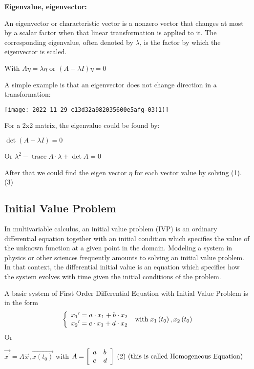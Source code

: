 \documentclass[a4paper]{article}
\begin{document}
\textbf{Eigenvalue, eigenvector:}

An eigenvector or characteristic vector is a nonzero vector that changes at most by a scalar factor when that linear transformation is applied to it. The corresponding eigenvalue, often denoted by $\lambda$, is the factor by which the eigenvector is scaled.

With $A \eta=\lambda \eta$ or $(A-\lambda I) \eta=0$

A simple example is that an eigenvector does not change direction in a transformation:

\begin{center}
	\texttt{[image: 2022\_11\_29\_c13d32a982035600e5afg-03(1)]}
\end{center}

For a 2x2 matrix, the eigenvalue could be found by:

$\operatorname{det}(A-\lambda I)=0$

Or $\lambda^{2}-\operatorname{trace} A \cdot \lambda+\operatorname{det} A=0$

After that we could find the eigen vector $\eta$ for each vector value by solving (1). (3)


	\subsection{Initial Value Problem}
	

\enskip \enskip \enskip In multivariable calculus, an initial value problem (IVP) is an ordinary differential equation together with an initial condition which specifies the value of the unknown function at a given point in the domain. Modeling a system in physics or other sciences frequently amounts to solving an initial value problem. In that context, the differential initial value is an equation which specifies how the system evolves with time given the initial conditions of the problem.

A basic system of First Order Differential Equation with Initial Value Problem is in the form $$\left\{\begin{array}{l}x_{1}{ }^{\prime}=a \cdot x_{1}+b \cdot x_{2} \\ x_{2}{ }^{\prime}=c \cdot x_{1}+d \cdot x_{2}\end{array}\right. \text{\;with\;} x_{1}\left(t_{0}\right), x_{2}\left(t_{0}\right)$$
Or 

$\overrightarrow{x^{\prime}}=A \vec{x}, \overrightarrow{x\left(t_{0}\right)}$ with $A=\left[\begin{array}{ll}a & b \\ c & d\end{array}\right]  \text{\;(2) (this is called Homogeneous Equation)}$
\end{document}
